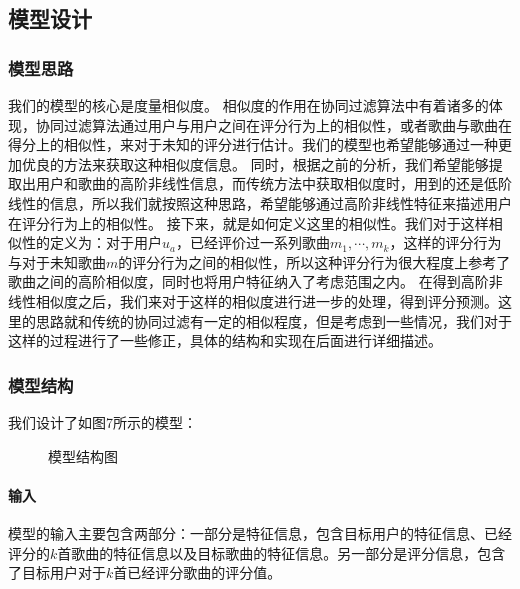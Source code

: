 \subsection{模型设计}
\subsubsection{模型思路}
我们的模型的核心是度量相似度。
相似度的作用在协同过滤算法中有着诸多的体现，协同过滤算法通过用户与用户之间在评分行为上的相似性，或者歌曲与歌曲在得分上的相似性，来对于未知的评分进行估计。我们的模型也希望能够通过一种更加优良的方法来获取这种相似度信息。
同时，根据之前的分析，我们希望能够提取出用户和歌曲的高阶非线性信息，而传统方法中获取相似度时，用到的还是低阶线性的信息，所以我们就按照这种思路，希望能够通过高阶非线性特征来描述用户在评分行为上的相似性。
接下来，就是如何定义这里的相似性。我们对于这样相似性的定义为：对于用户$u_a$，已经评价过一系列歌曲$m_1, \cdots, m_k$，这样的评分行为与对于未知歌曲$m$的评分行为之间的相似性，所以这种评分行为很大程度上参考了歌曲之间的高阶相似度，同时也将用户特征纳入了考虑范围之内。
在得到高阶非线性相似度之后，我们来对于这样的相似度进行进一步的处理，得到评分预测。这里的思路就和传统的协同过滤有一定的相似程度，但是考虑到一些情况，我们对于这样的过程进行了一些修正，具体的结构和实现在后面进行详细描述。

\subsubsection{模型结构}
我们设计了如图7所示的模型：
\begin{figure}[htb]        
\caption{\label{4} 模型结构图}      
\end{figure}

\paragraph{输入}
模型的输入主要包含两部分：一部分是特征信息，包含目标用户的特征信息、已经评分的$k$首歌曲的特征信息以及目标歌曲的特征信息。另一部分是评分信息，包含了目标用户对于$k$首已经评分歌曲的评分值。

